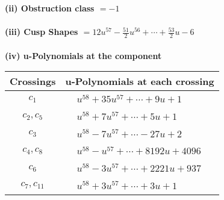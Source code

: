 \documentclass[1p]{elsarticle_modified}
\theoremstyle{definition}
\begin{document}
\flushleft \textbf{(ii) Obstruction class $= -1$}\\~\\
\flushleft \textbf{(iii) Cusp Shapes $= 12 u^{57}-\frac{51}{2} u^{56}+\cdots+\frac{53}{2} u-6$}\\~\\
\newpage\renewcommand{\arraystretch}{1}
\flushleft \textbf{(iv) u-Polynomials at the component}\newline \\
\begin{tabular}{m{50pt}|m{274pt}}
Crossings & \hspace{64pt}u-Polynomials at each crossing \\
\hline $$\begin{aligned}c_{1}\end{aligned}$$&$\begin{aligned}
&u^{58}+35 u^{57}+\cdots+9 u+1
\end{aligned}$\\
\hline $$\begin{aligned}c_{2},c_{5}\end{aligned}$$&$\begin{aligned}
&u^{58}+7 u^{57}+\cdots+5 u+1
\end{aligned}$\\
\hline $$\begin{aligned}c_{3}\end{aligned}$$&$\begin{aligned}
&u^{58}-7 u^{57}+\cdots-27 u+2
\end{aligned}$\\
\hline $$\begin{aligned}c_{4},c_{8}\end{aligned}$$&$\begin{aligned}
&u^{58}- u^{57}+\cdots+8192 u+4096
\end{aligned}$\\
\hline $$\begin{aligned}c_{6}\end{aligned}$$&$\begin{aligned}
&u^{58}-3 u^{57}+\cdots+2221 u+937
\end{aligned}$\\
\hline $$\begin{aligned}c_{7},c_{11}\end{aligned}$$&$\begin{aligned}
&u^{58}+3 u^{57}+\cdots+3 u+1
\end{aligned}$\\

\end{tabular}
\end{document}
